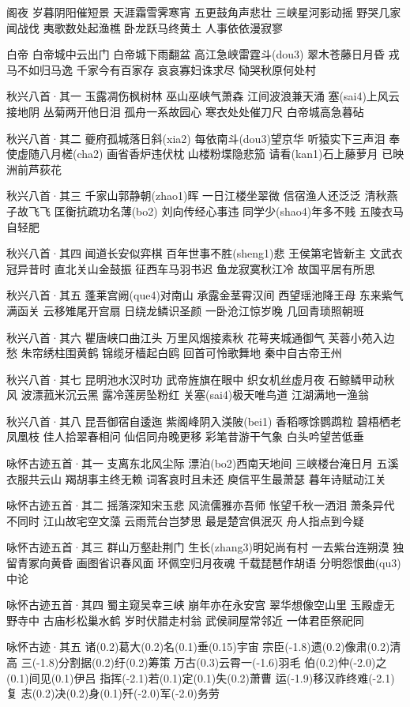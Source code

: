 \documentclass[a4paper]{article}
\begin{document}
阁夜
岁暮阴阳催短景 天涯霜雪霁寒宵
五更鼓角声悲壮 三峡星河影动摇
野哭几家闻战伐 夷歌数处起渔樵
卧龙跃马终黄土 人事依依漫寂寥

白帝
白帝城中云出门 白帝城下雨翻盆
高江急峡雷霆斗(dou3) 翠木苍藤日月昏
戎马不如归马逸 千家今有百家存
哀哀寡妇诛求尽 恸哭秋原何处村

秋兴八首·其一
玉露凋伤枫树林 巫山巫峡气萧森
江间波浪兼天涌 塞(sai4)上风云接地阴
丛菊两开他日泪 孤舟一系故园心
寒衣处处催刀尺 白帝城高急暮砧

秋兴八首·其二
夔府孤城落日斜(xia2) 每依南斗(dou3)望京华
听猿实下三声泪 奉使虚随八月槎(cha2)
画省香炉违伏枕 山楼粉堞隐悲笳
请看(kan1)石上藤萝月 已映洲前芦荻花

秋兴八首·其三
千家山郭静朝(zhao1)晖 一日江楼坐翠微
信宿渔人还泛泛 清秋燕子故飞飞
匡衡抗疏功名薄(bo2) 刘向传经心事违
同学少(shao4)年多不贱 五陵衣马自轻肥

秋兴八首·其四
闻道长安似弈棋 百年世事不胜(sheng1)悲
王侯第宅皆新主 文武衣冠异昔时
直北关山金鼓振 征西车马羽书迟
鱼龙寂寞秋江冷 故国平居有所思

秋兴八首·其五
蓬莱宫阙(que4)对南山 承露金茎霄汉间
西望瑶池降王母 东来紫气满函关
云移雉尾开宫扇 日绕龙鳞识圣颜
一卧沧江惊岁晚 几回青琐照朝班

秋兴八首·其六
瞿唐峡口曲江头 万里风烟接素秋
花萼夹城通御气 芙蓉小苑入边愁
朱帘绣柱围黄鹤 锦缆牙樯起白鸥
回首可怜歌舞地 秦中自古帝王州

秋兴八首·其七
昆明池水汉时功 武帝旌旗在眼中
织女机丝虚月夜 石鲸鳞甲动秋风
波漂菰米沉云黑 露冷莲房坠粉红
关塞(sai4)极天唯鸟道 江湖满地一渔翁

秋兴八首·其八
昆吾御宿自逶迤 紫阁峰阴入渼陂(bei1)
香稻啄馀鹦鹉粒 碧梧栖老凤凰枝
佳人拾翠春相问 仙侣同舟晚更移
彩笔昔游干气象 白头吟望苦低垂

咏怀古迹五首·其一
支离东北风尘际 漂泊(bo2)西南天地间
三峡楼台淹日月 五溪衣服共云山
羯胡事主终无赖 词客哀时且未还
庾信平生最萧瑟 暮年诗赋动江关
 
咏怀古迹五首·其二
摇落深知宋玉悲 风流儒雅亦吾师
怅望千秋一洒泪 萧条异代不同时
江山故宅空文藻 云雨荒台岂梦思
最是楚宫俱泯灭 舟人指点到今疑
 
咏怀古迹五首·其三
群山万壑赴荆门 生长(zhang3)明妃尚有村
一去紫台连朔漠 独留青冢向黄昏
画图省识春风面 环佩空归月夜魂
千载琵琶作胡语 分明怨恨曲(qu3)中论
 
咏怀古迹五首·其四
蜀主窥吴幸三峡 崩年亦在永安宫
翠华想像空山里 玉殿虚无野寺中
古庙杉松巢水鹤 岁时伏腊走村翁
武侯祠屋常邻近 一体君臣祭祀同
 
咏怀古迹·其五
诸(0.2)葛大(0.2)名(0.1)垂(0.15)宇宙 宗臣(-1.8)遗(0.2)像肃(0.2)清高
三(-1.8)分割据(0.2)纡(0.2)筹策 万古(0.3)云霄一(-1.6)羽毛
伯(0.2)仲(-2.0)之(0.1)间见(0.1)伊吕 指挥(-2.1)若(0.1)定(0.1)失(0.2)萧曹
运(-1.9)移汉祚终难(-2.1)复 志(0.2)决(0.2)身(0.1)歼(-2.0)军(-2.0)务劳

\end{document}
